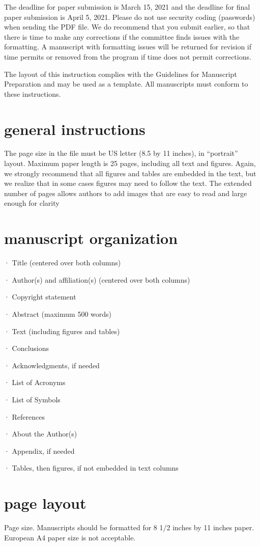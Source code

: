 \documentclass[10pt,twocolumn,twoside]{article}
\begin{document}
The deadline for paper submission is March 15, 2021 and the deadline for final paper submission is April 5, 2021. Please do not use security coding (passwords) when sending the PDF file. We do recommend that you submit earlier, so that there is time to make any corrections if the committee finds issues with the formatting. A manuscript with formatting issues will be returned for revision if time permits or removed from the program if time does not permit corrections.

The layout of this instruction complies with the Guidelines for Manuscript Preparation and may be used as a template. All manuscripts must conform to these instructions.

\section{general instructions}
The page size in the file must be US letter (8.5 by 11 inches), in “portrait” layout. Maximum paper length is 25 pages, including all text and figures. Again, we strongly recommend that all figures and tables are embedded in the text, but we realize that in some cases figures may need to follow the text. The extended number of pages allows authors to add images that are easy to read and large enough for clarity

\section{manuscript organization}
·	Title (centered over both columns)

·	Author(s) and affiliation(s) (centered over both columns)

·	Copyright statement

·	Abstract (maximum 500 words)

·	Text (including figures and tables)

·	Conclusions

·	Acknowledgments, if needed

·	List of Acronyms

·	List of Symbols

·	References

·	About the Author(s)

·	Appendix, if needed

·	Tables, then figures, if not embedded in text columns

\section{page layout}
Page size. Manuscripts should be formatted for 8 1/2 inches by 11 inches paper. European A4 paper size is not acceptable.
\end{document}
